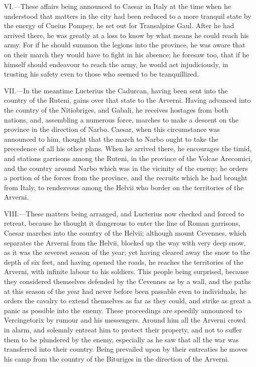 VI.—These affairs being announced to Caesar in Italy at the time when
he understood that matters in the city had been reduced to a more
tranquil state by the energy of Cneius Pompey, he set out for
Transalpine Gaul. After he had arrived there, he was greatly at a loss
to know by what means he could reach his army. For if he should summon
the legions into the province, he was aware that on their march they
would have to fight in his absence; he foresaw too, that if he himself
should endeavour to reach the army, he would act injudiciously, in
trusting his safety even to those who seemed to be tranquillized.

VII.—In the meantime Lucterius the Cadurcan, having been sent into the
country of the Ruteni, gains over that state to the Arverni. Having
advanced into the country of the Nitiobriges, and Gabali, he receives
hostages from both nations, and, assembling a numerous force, marches to
make a descent on the province in the direction of Narbo. Caesar, when
this circumstance was announced to him, thought that the march to Narbo
ought to take the precedence of all his other plans. When he arrived
there, he encourages the timid, and stations garrisons among the Ruteni,
in the province of the Volcae Arecomici, and the country around Narbo
which was in the vicinity of the enemy; he orders a portion of the
forces from the province, and the recruits which he had brought from
Italy, to rendezvous among the Helvii who border on the territories of
the Arverni.

VIII.—These matters being arranged, and Lucterius now checked and
forced to retreat, because he thought it dangerous to enter the line of
Roman garrisons, Caesar marches into the country of the Helvii; although
mount Cevennes, which separates the Arverni from the Helvii, blocked up
the way with very deep snow, as it was the severest season of the year;
yet having cleared away the snow to the depth of six feet, and having
opened the roads, he reaches the territories of the Arverni, with
infinite labour to his soldiers. This people being surprised, because
they considered themselves defended by the Cevennes as by a wall, and
the paths at this season of the year had never before been passable even
to individuals, he orders the cavalry to extend themselves as far as
they could, and strike as great a panic as possible into the enemy.
These proceedings are speedily announced to Vercingetorix by rumour and
his messengers. Around him all the Arverni crowd in alarm, and solemnly
entreat him to protect their property, and not to suffer them to be
plundered by the enemy, especially as he saw that all the war was
transferred into their country. Being prevailed upon by their entreaties
he moves his camp from the country of the Bituriges in the direction of
the Arverni.

